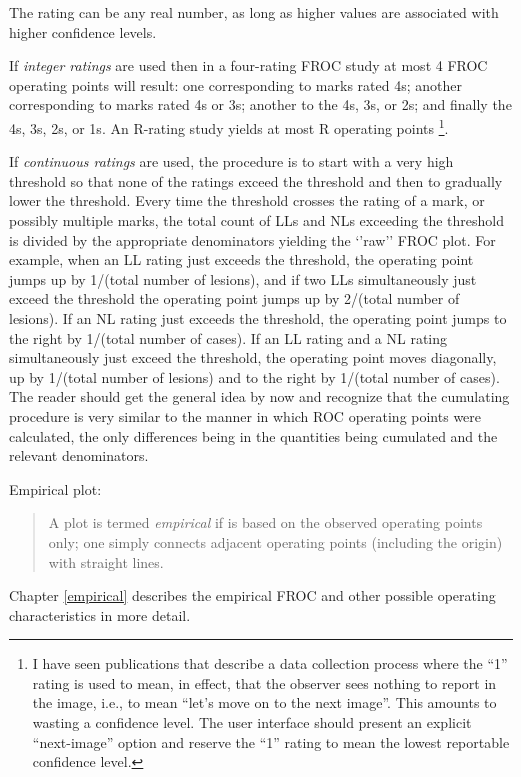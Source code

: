 \documentclass[
]{book}
\begin{document}
The rating can be any real number, as long as higher values are associated with higher confidence levels.

If \emph{integer ratings} are used then in a four-rating FROC study at most 4 FROC operating points will result: one corresponding to marks rated 4s; another corresponding to marks rated 4s or 3s; another to the 4s, 3s, or 2s; and finally the 4s, 3s, 2s, or 1s. An R-rating study yields at most R operating points \footnote{I have seen publications that describe a data collection process where the ``1'' rating is used to mean, in effect, that the observer sees nothing to report in the image, i.e., to mean ``let's move on to the next image''. This amounts to wasting a confidence level. The user interface should present an explicit ``next-image'' option and reserve the ``1'' rating to mean the lowest reportable confidence level.}.

If \emph{continuous ratings} are used, the procedure is to start with a very high threshold so that none of the ratings exceed the threshold and then to gradually lower the threshold. Every time the threshold crosses the rating of a mark, or possibly multiple marks, the total count of LLs and NLs exceeding the threshold is divided by the appropriate denominators yielding the `'raw'' FROC plot. For example, when an LL rating just exceeds the threshold, the operating point jumps up by 1/(total number of lesions), and if two LLs simultaneously just exceed the threshold the operating point jumps up by 2/(total number of lesions). If an NL rating just exceeds the threshold, the operating point jumps to the right by 1/(total number of cases). If an LL rating and a NL rating simultaneously just exceed the threshold, the operating point moves diagonally, up by 1/(total number of lesions) and to the right by 1/(total number of cases). The reader should get the general idea by now and recognize that the cumulating procedure is very similar to the manner in which ROC operating points were calculated, the only differences being in the quantities being cumulated and the relevant denominators.

Empirical plot:

\begin{quote}
A plot is termed \emph{empirical} if is based on the observed operating points only; one simply connects adjacent operating points (including the origin) with straight lines.
\end{quote}

Chapter \ref{empirical} describes the empirical FROC and other possible operating characteristics in more detail.
\end{document}
